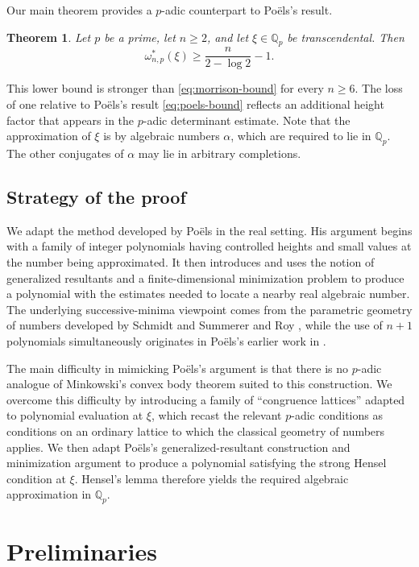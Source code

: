 \documentclass[10pt,a4paper]{amsart}
\newtheorem{theorem}{Theorem}[section]
\newcommand{\Qp}{\mathbb Q_p}
\begin{document}
Our main theorem provides a $p$-adic counterpart to Po\"els's result.


\begin{theorem}\label{thm:main}
Let $p$ be a prime, let $n\geq2$, and let $\xi\in\Qp$ be transcendental. Then
$$
\omega^*_{n,p}(\xi)
\geq\frac{n}{2-\log2}-1.
$$
\end{theorem}


This lower bound is stronger than \eqref{eq:morrison-bound} for every $n\geq6$. The loss of one relative to Po\"els's result \eqref{eq:poels-bound} reflects an additional height factor that appears in the $p$-adic determinant estimate.
Note that the approximation of $\xi$ is by algebraic numbers $\alpha$, which are required to lie in $\Qp$.
The other conjugates of $\alpha$ may lie in arbitrary completions.

\subsection{Strategy of the proof}

We adapt the method developed by Po\"els \cite{PoelsWirsing} in the real
setting. His argument begins with a family of integer polynomials having
controlled heights and small values at the number being approximated. It then
introduces and uses the notion of generalized resultants and a finite-dimensional minimization problem to
produce a polynomial with the estimates needed to locate a nearby real algebraic
number. The underlying successive-minima viewpoint comes from the parametric
geometry of numbers developed by Schmidt and Summerer
\cite{SchmidtSummerer2009,SchmidtSummerer2013} and Roy \cite{Roy}, while the use of
$n+1$ polynomials simultaneously originates in Po\"els's earlier work in
\cite{PoelsUniform}.

The main difficulty in mimicking Po\"els's argument is that there is no
$p$-adic analogue of Minkowski's convex body theorem suited to this
construction. We overcome this difficulty by introducing a family of ``congruence lattices'' adapted to
 polynomial evaluation at $\xi$, which recast the relevant $p$-adic conditions as conditions on an ordinary
lattice to which the classical geometry of numbers applies. We then adapt
Po\"els's generalized-resultant construction and minimization argument to
produce a polynomial satisfying the strong Hensel condition at $\xi$.
Hensel's lemma therefore yields the required algebraic approximation in
$\Qp$.


\bigskip
\section{\bf Preliminaries}
\bigskip
\end{document}
